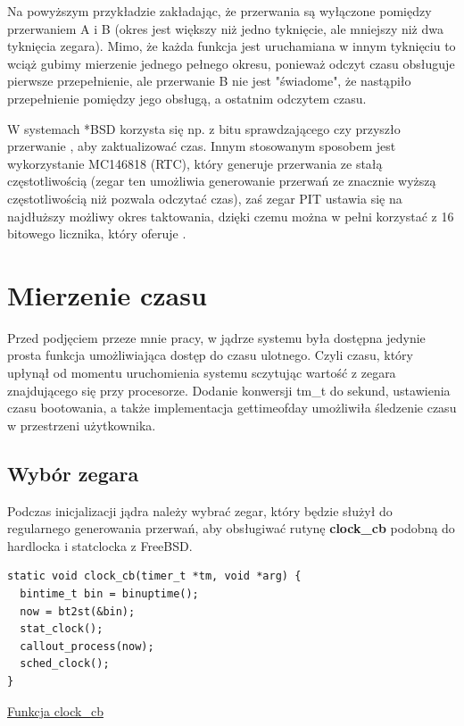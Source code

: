 \documentclass[shortabstract]{iithesis}
\theoremstyle{definition} \newtheorem*{definition}{Definicja}
\theoremstyle{definition} \newtheorem*{example}{Przykład}
\theoremstyle{definition} \newtheorem*{remark}{Uwaga}
\newenvironment{longlisting}{\captionsetup{type=listing}}{}
\begin{document}
Na powyższym przykładzie zakładając, że przerwania są wyłączone pomiędzy przerwaniem A i B (okres jest większy niż jedno tyknięcie, ale mniejszy niż dwa tyknięcia zegara). Mimo, że każda funkcja jest uruchamiana w innym tyknięciu to wciąż gubimy mierzenie jednego pełnego okresu, ponieważ odczyt czasu obsługuje pierwsze przepełnienie, ale przerwanie B nie jest "świadome", że nastąpiło przepełnienie pomiędzy jego obsługą, a ostatnim odczytem czasu.

W systemach *BSD korzysta się np. z bitu sprawdzającego czy przyszło przerwanie \cite{bib:pitbitpending}, aby zaktualizować czas. Innym stosowanym sposobem jest wykorzystanie MC146818 (RTC), który generuje przerwania ze stałą częstotliwością (zegar ten umożliwia generowanie przerwań ze znacznie wyższą częstotliwością niż pozwala odczytać czas), zaś zegar PIT ustawia się na najdłuższy możliwy okres taktowania, dzięki czemu można w pełni korzystać z 16 bitowego licznika, który oferuje \cite{bib:pitrtc}.


\section{Mierzenie czasu}
Przed podjęciem przeze mnie pracy, w jądrze systemu była dostępna jedynie prosta funkcja umożliwiająca dostęp do czasu ulotnego. Czyli czasu, który upłynął od momentu uruchomienia systemu sczytując wartość z zegara znajdującego się przy procesorze. Dodanie konwersji tm\_t do sekund, ustawienia czasu bootowania, a także implementacja gettimeofday umożliwiła śledzenie czasu w przestrzeni użytkownika.

\subsection{Wybór zegara}
Podczas inicjalizacji jądra należy wybrać zegar, który będzie służył do regularnego generowania przerwań, aby obsługiwać rutynę \textbf{clock\_cb} podobną do hardlocka i statclocka z FreeBSD.

\begin{longlisting}
  \begin{verbatim}
static void clock_cb(timer_t *tm, void *arg) {
  bintime_t bin = binuptime();
  now = bt2st(&bin);
  stat_clock();
  callout_process(now);
  sched_clock();
}
  \end{verbatim}
  \caption{\href{https://mimiker.ii.uni.wroc.pl/source/xref/mimiker/sys/kern/clock.c?r=039f8f3e\#20}{Funkcja clock\_cb}}
  \label{lst:funcclockcb}
\end{longlisting}
\end{document}
